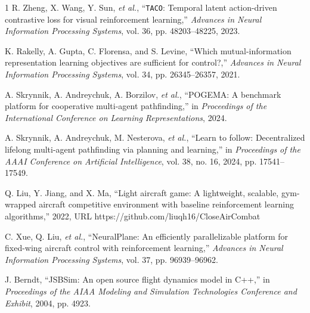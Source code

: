 \documentclass[letterpaper, 10 pt, conference]{ieeeconf}
\begin{document}
\begin{thebibliography}{1}
    R. Zheng, X. Wang, Y. Sun, \textit{et al.}, ``\texttt{TACO}: Temporal latent action-driven contrastive loss for visual reinforcement learning,'' \emph{Advances in Neural Information Processing Systems}, vol. 36, pp. 48203--48225, 2023.

    K. Rakelly, A. Gupta, C. Florensa, and S. Levine, ``Which mutual-information representation learning objectives are sufficient for control?,'' \emph{Advances in Neural Information Processing Systems}, vol. 34, pp. 26345--26357, 2021.

    A. Skrynnik, A. Andreychuk, A. Borzilov, \textit{et al.}, ``{{POGEMA}}: A benchmark platform for cooperative multi-agent pathfinding,'' in \emph{Proceedings of the International Conference on Learning Representations}, 2024.

    A. Skrynnik, A. Andreychuk, M. Nesterova, \textit{et al.}, ``Learn to follow: Decentralized lifelong multi-agent pathfinding via planning and learning,'' in \emph{Proceedings of the AAAI Conference on Artificial Intelligence}, vol. 38, no. 16, 2024, pp. 17541--17549.



    Q. Liu, Y. Jiang, and X. Ma, ``Light aircraft game: A lightweight, scalable, gym-wrapped aircraft competitive environment with baseline reinforcement learning algorithms,'' 2022, URL https://github.com/liuqh16/CloseAirCombat

    C. Xue, Q. Liu, \textit{et al.}, ``NeuralPlane: An efficiently parallelizable platform for fixed-wing aircraft control with reinforcement learning,'' \emph{Advances in Neural Information Processing Systems}, vol. 37, pp. 96939--96962.
    
    J. Berndt, ``{{JSBSim}}: An open source flight dynamics model in {C}++,'' in \emph{Proceedings of the AIAA Modeling and Simulation Technologies Conference and Exhibit}, 2004, pp. 4923.


\end{thebibliography}
\end{document}
